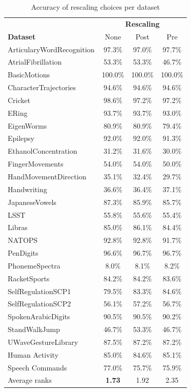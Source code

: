 \documentclass{article}
\theoremstyle{definition}
\theoremstyle{remark}
\begin{document}
	\begin{table}[h]
	\small
	\centering
	\caption{Accuracy of rescaling choices per dataset}
	\label{tab:complete_results_rescaling}
	\begin{tabular}{lccc}
	\toprule
	& \multicolumn{3}{c}{\textbf{Rescaling}}\\
	 \cmidrule{2-4}
	\textbf{Dataset}& None & Post & Pre \\
	\midrule
	ArticularyWordRecognition & 97.3\% & 97.0\% & 97.7\% \\
	AtrialFibrillation & 53.3\% & 53.3\% & 46.7\% \\
	BasicMotions & 100.0\% & 100.0\% & 100.0\% \\
	CharacterTrajectories & 94.6\% & 94.6\% & 94.6\% \\
	Cricket & 98.6\% & 97.2\% & 97.2\% \\
	ERing & 93.7\% & 93.7\% & 93.0\% \\
	EigenWorms & 80.9\% & 80.9\% & 79.4\% \\
	Epilepsy & 92.0\% & 92.0\% & 91.3\% \\
	EthanolConcentration & 31.2\% & 31.6\% & 30.0\% \\
	FingerMovements & 54.0\% & 54.0\% & 50.0\% \\
	HandMovementDirection & 35.1\% & 32.4\% & 29.7\% \\
	Handwriting & 36.6\% & 36.4\% & 37.1\% \\
	JapaneseVowels & 87.3\% & 85.9\% & 85.7\% \\
	LSST & 55.8\% & 55.6\% & 55.4\% \\
	Libras & 85.0\% & 86.1\% & 84.4\% \\
	NATOPS & 92.8\% & 92.8\% & 91.7\% \\
	PenDigits & 96.6\% & 96.7\% & 96.7\% \\
	PhonemeSpectra & 8.0\% & 8.1\% & 8.2\% \\
	RacketSports & 84.2\% & 84.2\% & 83.6\% \\
	SelfRegulationSCP1 & 79.5\% & 83.3\% & 84.6\% \\
	SelfRegulationSCP2 & 56.1\% & 57.2\% & 56.7\% \\
	SpokenArabicDigits & 90.5\% & 90.5\% & 90.2\% \\
	StandWalkJump & 46.7\% & 53.3\% & 46.7\% \\
	UWaveGestureLibrary & 87.5\% & 87.2\% & 87.2\% \\
	Human Activity & 85.0\% & 84.6\% & 85.1\% \\
	Speech Commands & 77.0\% & 75.7\% & 75.9\% \\
	\midrule
	Average ranks & \textbf{1.73} & 1.92 & 2.35 \\
	\bottomrule
	\end{tabular}
	\end{table}
\end{document}

